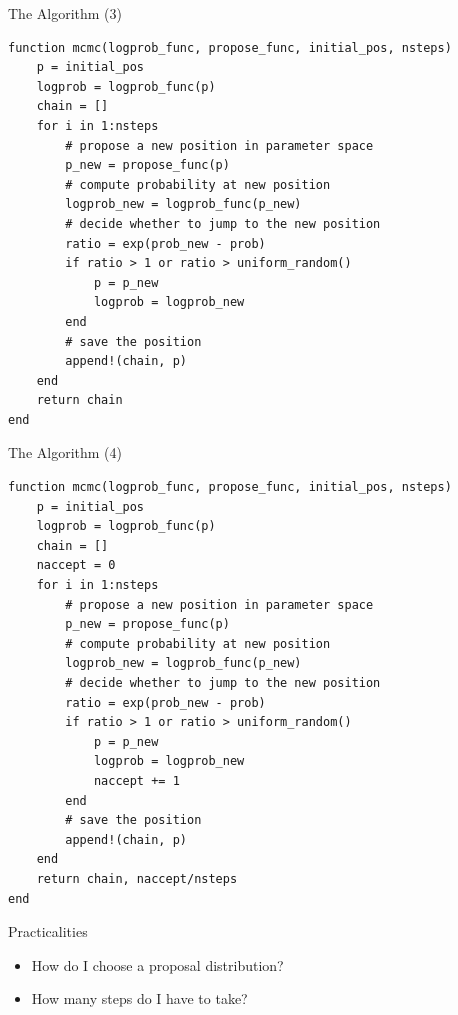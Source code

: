 \documentclass{beamer}
\begin{document}
\begin{frame}[fragile]{The Algorithm (3)}
\begin{footnotesize}
\begin{verbatim}
function mcmc(logprob_func, propose_func, initial_pos, nsteps)
    p = initial_pos
    logprob = logprob_func(p)
    chain = []
    for i in 1:nsteps
        # propose a new position in parameter space
        p_new = propose_func(p)
        # compute probability at new position
        logprob_new = logprob_func(p_new)
        # decide whether to jump to the new position
        ratio = exp(prob_new - prob)
        if ratio > 1 or ratio > uniform_random()
            p = p_new
            logprob = logprob_new
        end
        # save the position
        append!(chain, p)
    end
    return chain
end
\end{verbatim}
\end{footnotesize}
\end{frame}

\begin{frame}[fragile]{The Algorithm (4)}
\begin{scriptsize}
\begin{verbatim}
function mcmc(logprob_func, propose_func, initial_pos, nsteps)
    p = initial_pos
    logprob = logprob_func(p)
    chain = []
    naccept = 0
    for i in 1:nsteps
        # propose a new position in parameter space
        p_new = propose_func(p)
        # compute probability at new position
        logprob_new = logprob_func(p_new)
        # decide whether to jump to the new position
        ratio = exp(prob_new - prob)
        if ratio > 1 or ratio > uniform_random()
            p = p_new
            logprob = logprob_new
            naccept += 1
        end
        # save the position
        append!(chain, p)
    end
    return chain, naccept/nsteps
end
\end{verbatim}
\end{scriptsize}
\end{frame}









%
%
%


\begin{frame}{Practicalities}
\begin{itemize}
\item How do I choose a proposal distribution?
\item How many steps do I have to take?
\end{itemize}
\end{frame}
\end{document}

